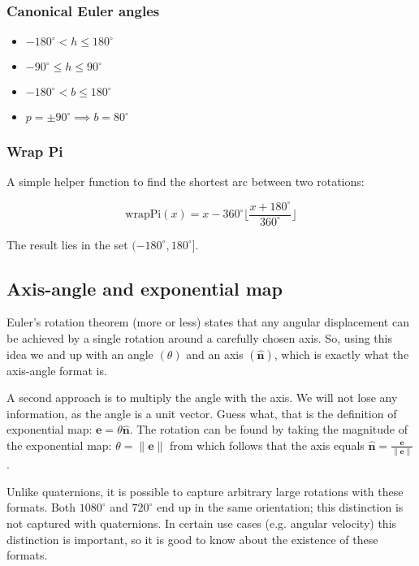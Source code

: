 \subsubsection{Canonical Euler angles}

\begin{itemize}
	\item $-180^\circ < h \leq 180^\circ$
	\item $-90^\circ \leq h \leq 90^\circ$
	\item $-180^\circ < b \leq 180^\circ$
	\item $p=\pm 90^\circ \implies b=80^\circ$
\end{itemize}

\subsubsection{Wrap Pi}

A simple helper function to find the shortest arc between two rotations:

$$\text{wrapPi}(x)=x-360^\circ \lfloor \frac{x+180^\circ}{360^\circ} \rfloor$$

\noindent The result lies in the set $(-180^\circ,180^\circ]$.

\subsection{Axis-angle and exponential map}

Euler's rotation theorem (more or less) states that any angular displacement can be achieved by a single rotation around a carefully chosen axis. So, using this idea we and up with an angle $(\theta)$ and an axis $(\hat{\textbf{n}})$, which is exactly what the axis-angle format is.

A second approach is to multiply the angle with the axis. We will not lose any information, as the angle is a unit vector. Guess what, that is the definition of exponential map: $\textbf{e}=\theta\hat{\textbf{n}}$. The rotation can be found by taking the magnitude of the exponential map: $\theta=\|\textbf{e}\|$ from which follows that the axis equals $\hat{\textbf{n}}=\frac{\textbf{e}}{\|\textbf{e}\|}$.

Unlike quaternions, it is possible to capture arbitrary large rotations with these formats. Both $1080^\circ$ and $720^\circ$ end up in the same orientation; this distinction is not captured with quaternions. In certain use cases (e.g. angular velocity) this distinction is important, so it is good to know about the existence of these formats.

